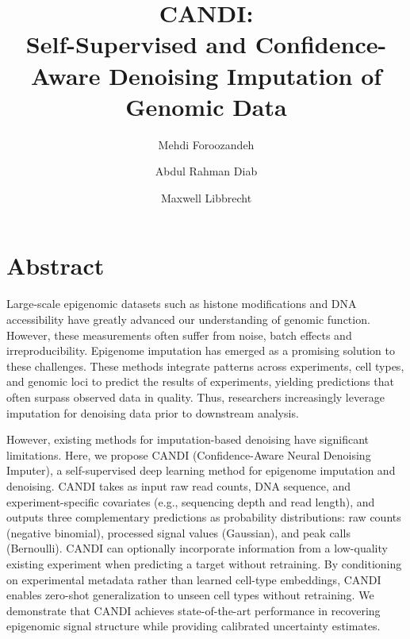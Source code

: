 \documentclass[a4paper, 11pt]{article}
\title{CANDI:\\ Self-Supervised and Confidence-Aware Denoising Imputation of Genomic Data}
\author[1]{Mehdi Foroozandeh}
\author[1]{Abdul Rahman Diab}
\author[1]{Maxwell Libbrecht}
\affil[1]{School of Computing Science, Simon Fraser University, Burnaby, Canada}
\date{}
\begin{document}
\maketitle

\section*{Abstract}
Large-scale epigenomic datasets such as histone modifications and DNA accessibility have greatly advanced our understanding of genomic function.  However, these measurements often suffer from noise, batch effects and irreproducibility. Epigenome imputation has emerged as a promising solution to these challenges. These methods integrate patterns across experiments, cell types, and genomic loci to predict the results of experiments, yielding predictions that often surpass observed data in quality. Thus, researchers increasingly leverage imputation for denoising data prior to downstream analysis. 

However, existing methods for imputation-based denoising have significant limitations. Here, we propose CANDI (Confidence-Aware Neural Denoising Imputer), a self-supervised deep learning method for epigenome imputation and denoising. CANDI takes as input raw read counts, DNA sequence, and experiment-specific covariates (e.g., sequencing depth and read length), and outputs three complementary predictions as probability distributions: raw counts (negative binomial), processed signal values (Gaussian), and peak calls (Bernoulli). CANDI can optionally incorporate information from a low-quality existing experiment when predicting a target without retraining. By conditioning on experimental metadata rather than learned cell-type embeddings, CANDI enables zero-shot generalization to unseen cell types without retraining. We demonstrate that CANDI achieves state-of-the-art performance in recovering epigenomic signal structure while providing calibrated uncertainty estimates.


\end{document}

